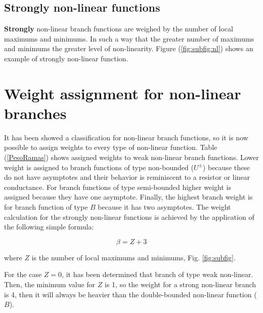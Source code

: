 \documentclass[conference,letterpaper,onecolumn,11pt]{IEEEtran}
\begin{document}
\subsection{Strongly non-linear functions}

{\bf Strongly} non-linear branch functions are weighed by the number of local maximums and minimums. In such a way that the greater number of maximums and minimums the greater level of non-linearity. Figure (\ref{fig:subfig:nl}) shows an example of strongly non-linear function.

\section{Weight assignment for non-linear branches}

It has been showed a classification for non-linear branch functions, so it is now possible to assign weights to every type of non-linear function. Table (\ref{PesoRamas}) shows assigned weights to weak non-linear branch functions. Lower weight is assigned to branch functions of type non-bounded ($U^{\pm}$) because these do not have asymptotes and their behavior is reminiscent to a resistor or linear conductance. For branch functions of type semi-bounded higher weight is assigned because they have one asymptote. Finally, the highest branch weight is for branch function of type $B$ because it has two asymptotes. The weight calculation for the strongly non-linear functions is achieved by the application of the following simple formula:

\begin{displaymath}
\beta=Z+3
\end{displaymath}

where $Z$ is the number of local maximums and minimums, Fig. \ref{fig:subfig}.

\begin{table}[!h]
\caption{Weight for weakly non-linear functions}
\label{PesoRamas}
\end{table}

For the case $Z=0$, it has been determined that branch of type weak non-linear. Then, the minimum value for $Z$ is 1, so the weight for a strong non-linear branch is 4, then it will always be heavier than the double-bounded non-linear function ($B$).
\end{document}
